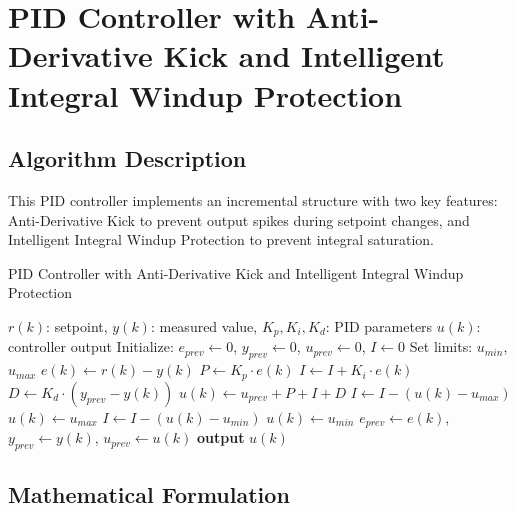 \documentclass{article}
\begin{document}
\section{PID Controller with Anti-Derivative Kick and Intelligent Integral Windup Protection}

\subsection{Algorithm Description}

This PID controller implements an incremental structure with two key features: Anti-Derivative Kick to prevent output spikes during setpoint changes, and Intelligent Integral Windup Protection to prevent integral saturation.

\begin{algorithm}
\caption{PID Controller with Anti-Derivative Kick and Intelligent Integral Windup Protection}
\label{alg:pid_enhanced}
\begin{algorithmic}[1]
\REQUIRE $r(k)$: setpoint, $y(k)$: measured value, $K_p, K_i, K_d$: PID parameters
\ENSURE $u(k)$: controller output
\STATE Initialize: $e_{prev} \leftarrow 0$, $y_{prev} \leftarrow 0$, $u_{prev} \leftarrow 0$, $I \leftarrow 0$
\STATE Set limits: $u_{min}$, $u_{max}$
    \STATE $e(k) \leftarrow r(k) - y(k)$ 
    \STATE $P \leftarrow K_p \cdot e(k)$ 
    \STATE $I \leftarrow I + K_i \cdot e(k)$ 
    \STATE $D \leftarrow K_d \cdot (y_{prev} - y(k))$ 
    \STATE $u(k) \leftarrow u_{prev} + P + I + D$ 
        \STATE $I \leftarrow I - (u(k) - u_{max})$ 
        \STATE $u(k) \leftarrow u_{max}$
        \STATE $I \leftarrow I - (u(k) - u_{min})$ 
        \STATE $u(k) \leftarrow u_{min}$
    \ENDIF
    \STATE $e_{prev} \leftarrow e(k)$, $y_{prev} \leftarrow y(k)$, $u_{prev} \leftarrow u(k)$
    \STATE \textbf{output} $u(k)$
\ENDWHILE
\end{algorithmic}
\end{algorithm}

\subsection{Mathematical Formulation}
\end{document}
